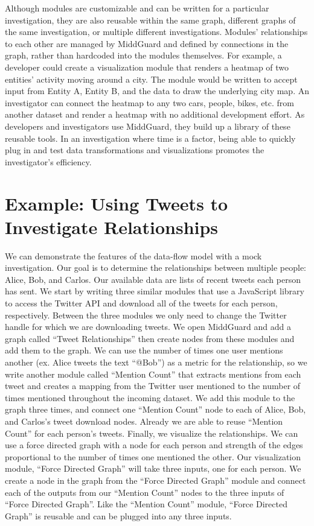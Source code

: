 \documentclass[midd]{thesis}
\begin{document}
Although modules are customizable and can be written for a particular
investigation, they are also reusable within the same graph, different graphs of
the same investigation, or multiple different investigations. Modules'
relationships to each other are managed by MiddGuard and defined by connections
in the graph, rather than hardcoded into the modules themselves. For example, a
developer could create a visualization module that renders a heatmap of two
entities' activity moving around a city. The module would be written to accept
input from Entity A, Entity B, and the data to draw the underlying city map. An
investigator can connect the heatmap to any two cars, people, bikes, etc. from
another dataset and render a heatmap with no additional development effort. As
developers and investigators use MiddGuard, they build up a library of these
reusable tools. In an investigation where time is a factor, being able to
quickly plug in and test data transformations and visualizations promotes the
investigator's efficiency.

\section{Example: Using Tweets to Investigate Relationships}

We can demonstrate the features of the data-flow model with a mock
investigation. Our goal is to determine the relationships between multiple
people: Alice, Bob, and Carlos. Our available data are lists of recent tweets
each person has sent. We start by writing three similar modules that use a
JavaScript library to access the Twitter API and download all of the tweets for
each person, respectively. Between the three modules we only need to change the
Twitter handle for which we are downloading tweets. We open MiddGuard and add a
graph called ``Tweet Relationships'' then create nodes from these modules and
add them to the graph. We can use the number of times one user mentions another
(ex. Alice tweets the text ``@Bob'') as a metric for the relationship, so we
write another module called ``Mention Count'' that extracts mentions from each
tweet and creates a mapping from the Twitter user mentioned to the number of
times mentioned throughout the incoming dataset. We add this module to the
graph three times, and connect one ``Mention Count'' node to each of Alice, Bob,
and Carlos's tweet download nodes. Already we are able to reuse ``Mention
Count'' for each person's tweets. Finally, we visualize the relationships. We
can use a force directed graph with a node for each person and strength of the
edges proportional to the number of times one mentioned the other. Our
visualization module, ``Force Directed Graph'' will take three inputs, one for
each person. We create a node in the graph from the ``Force Directed Graph''
module and connect each of the outputs from our ``Mention Count'' nodes to the
three inputs of ``Force Directed Graph''. Like the ``Mention Count'' module,
``Force Directed Graph'' is reusable and can be plugged into any three inputs.
\end{document}
